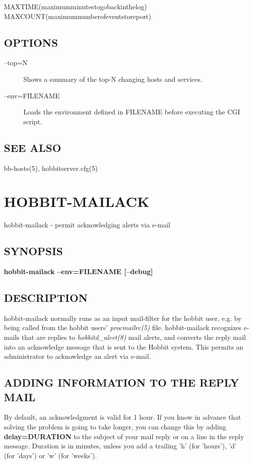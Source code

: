   
MAXTIME(maximumminutestogobackinthelog)  
MAXCOUNT(maximumnumberofeventstoreport) 


 
\subsection{OPTIONS}
\begin{description}
\item[--top=N] Shows a summary of the top-N changing hosts and services. 

 

\item[--env=FILENAME] Loads the environment defined in FILENAME before executing the CGI script. 

 


\end{description}
\subsection{SEE ALSO}
bb-hosts(5), hobbitserver.cfg(5) 

%
%
\newpage
\section{HOBBIT-MAILACK}

 hobbit-mailack - permit acknowledging alerts via e-mail \subsection{SYNOPSIS}
\textbf{hobbit-mailack --env=FILENAME [--debug]}


 
\subsection{DESCRIPTION}
 hobbit-mailack normally runs as an input mail-filter for the hobbit user, e.g. by being called from the hobbit users' \emph{procmailrc(5)}
 file. hobbit-mailack recognizes e-mails that are replies to \emph{hobbitd\_alert(8)}
 mail alerts, and converts the reply mail into an acknowledge message that is sent to the Hobbit system. This permits an administrator to acknowledge an alert via e-mail. 

 
\subsection{ADDING INFORMATION TO THE REPLY MAIL}
 By default, an acknowledgment is valid for 1 hour. If you know in advance that solving the problem is going to take longer, you can change this by adding \textbf{delay=DURATION}
 to the subject of your mail reply or on a line in the reply message. Duration is in minutes, unless you add a trailing 'h' (for 'hours'), 'd' (for 'days') or 'w' (for 'weeks'). 

